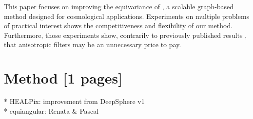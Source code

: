 \documentclass{article} %
\newcommand{\norm}[1]{\left\lVert#1\right\rVert}
\newcommand{\todo}[1]{{\color[rgb]{.6,.1,.6}{#1}}}
\begin{document}
This paper focuses on improving the equivariance of \cite{perraudin2019deepsphere}, a scalable graph-based method designed for cosmological applications.
\todo{cite RLGM paper}
Experiments on multiple problems of practical interest shows the competitiveness and flexibility of our method.
Furthermore, those experiments show, contrarily to previously published results \cite{cohen_gauge_2019}, that anisotropic filters may be an unnecessary price to pay.

\section{Method [1 pages]}

* HEALPix: improvement from DeepSphere v1 \cite{perraudin2019deepsphere} \\
* equiangular: Renata \& Pascal \\

\end{document}
